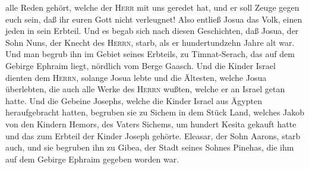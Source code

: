 alle Reden gehört, welche der \textsc{Herr} mit uns geredet hat, und er
soll Zeuge gegen euch sein, daß ihr euren Gott nicht verleugnet!
 Also entließ Josua das Volk, einen jeden in sein
Erbteil.  Und es begab sich nach diesen Geschichten, daß
Josua, der Sohn Nuns, der Knecht des \textsc{Herrn}, starb, als er
hundertundzehn Jahre alt war.  Und man begrub ihn im
Gebiet seines Erbteils, zu Timnat-Serach, das auf dem Gebirge Ephraim
liegt, nördlich vom Berge Gaasch.  Und die Kinder Israel
dienten dem \textsc{Herrn}, solange Josua lebte und die Ältesten, welche
Josua überlebten, die auch alle Werke des \textsc{Herrn} wußten, welche
er an Israel getan hatte.  Und die Gebeine Josephs,
welche die Kinder Israel aus Ägypten heraufgebracht hatten, begruben sie
zu Sichem in dem Stück Land, welches Jakob von den Kindern Hemors, des
Vaters Sichems, um hundert Kesita gekauft hatte und das zum Erbteil der
Kinder Joseph gehörte.  Eleasar, der Sohn Aarons, starb
auch, und sie begruben ihn zu Gibea, der Stadt seines Sohnes Pinehas,
die ihm auf dem Gebirge Ephraim gegeben worden war.
